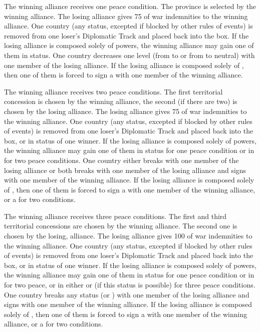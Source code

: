  The winning alliance receives one peace
condition.
 The province is selected by the winning
alliance. 
\bparag[Indemnities] The losing alliance gives 75 \ducats of war indemnities
to the winning alliance.
 One country (any status, excepted if
blocked by other rules of events) is removed from one loser's Diplomatic Track
and placed back into the \Neutral box. If the losing alliance is composed
solely of \MIN powers, the winning alliance may gain one of them in \MR
status.
 One \ROTW country decreases one level
(from \dipAT to \dipFR or from \dipFR to neutral) with one member of the losing
alliance. If the losing alliance is composed solely of \MIN, then one of them
is forced to sign a \dipFR with one member of the winning alliance.

 The winning alliance receives two peace conditions.
 The first territorial concession is chosen by
the winning alliance, the second (if there are two) is chosen by the losing
alliance.
\bparag[Indemnities] The losing alliance gives 75 \ducats of war indemnities
to the winning alliance.
 One country (any status, excepted if
blocked by other rules of events) is removed from one loser's Diplomatic Track
and placed back into the \Neutral box, or in \MR status of one winner. If the
losing alliance is composed solely of \MIN powers, the winning alliance may
gain one of them in \MR status for one peace condition or in \AM for two peace
conditions.
 One \ROTW country either breaks \dipAT
with one member of the losing alliance or both breaks \dipFR with one member
of the losing alliance and signs \dipFR with one member of the winning
alliance. If the losing alliance is composed solely of \MIN, then one of them
is forced to sign a \dipFR with one member of the winning alliance, or a
\dipAT for two conditions.

 The winning alliance receives three peace
conditions.
 The first and third territorial concessions
are chosen by the winning alliance. The second one is chosen by the losing,
alliance.
\bparag[Indemnities] The losing alliance gives 100 \ducats of war indemnities
to the winning alliance.
 One country (any status, excepted if
blocked by other rules of events) is removed from one loser's Diplomatic Track
and placed back into the \Neutral box, or in \MR status of one winner. If the
losing alliance is composed solely of \MIN powers, the winning alliance may
gain one of them in \MR status for one peace condition or in \AM for two
peace, or in either \EG or \VASSAL (if this status is possible) for three
peace conditions.
 One \ROTW country breaks any status
(\dipFR or \dipAT) with one member of the losing alliance and signs \dipFR
with one member of the winning alliance. If the losing alliance is composed
solely of \MIN, then one of them is forced to sign a \dipFR with one member of
the winning alliance, or a \dipAT for two conditions.

